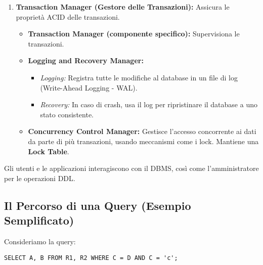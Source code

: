 \begin{enumerate}
    \item \textbf{Transaction Manager (Gestore delle Transazioni):} Assicura le proprietà ACID delle transazioni.
    \begin{itemize}
        \item \textbf{Transaction Manager (componente specifico):} Supervisiona le transazioni.
        \item \textbf{Logging and Recovery Manager:}
        \begin{itemize}
            \item \textit{Logging:} Registra tutte le modifiche al database in un file di log (Write-Ahead Logging - WAL).
            \item \textit{Recovery:} In caso di crash, usa il log per ripristinare il database a uno stato consistente.
        \end{itemize}
        \item \textbf{Concurrency Control Manager:} Gestisce l'accesso concorrente ai dati da parte di più transazioni, usando meccanismi come i lock. Mantiene una \textbf{Lock Table}.
    \end{itemize}
\end{enumerate}
Gli utenti e le applicazioni interagiscono con il DBMS, così come l'amministratore per le operazioni DDL.

\subsection{Il Percorso di una Query (Esempio Semplificato)}
Consideriamo la query:
\begin{verbatim}
SELECT A, B FROM R1, R2 WHERE C = D AND C = 'c';
\end{verbatim}


